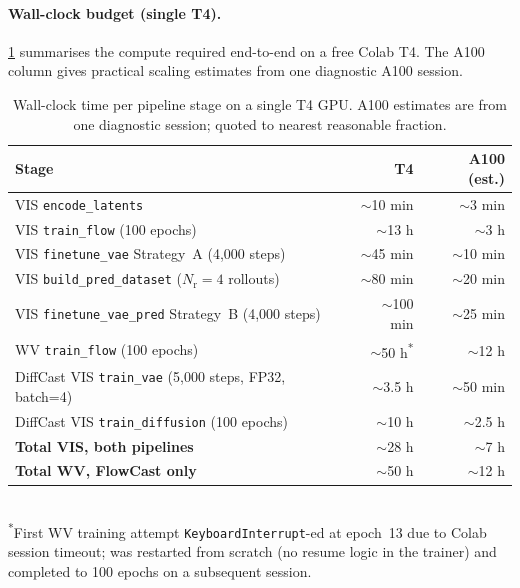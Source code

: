 \documentclass[11pt,a4paper]{article}
\begin{document}
\paragraph{Wall-clock budget (single T4).} \cref{tab:walltime} summarises
the compute required end-to-end on a free Colab T4. The A100 column gives
practical scaling estimates from one diagnostic A100 session.

\begin{table}[h]
\centering\small
\caption{Wall-clock time per pipeline stage on a single T4 GPU. A100
estimates are from one diagnostic session; quoted to nearest reasonable
fraction.}
\label{tab:walltime}
\begin{tabular}{lrr}
\toprule
Stage                                              & T4         & A100 (est.) \\
\midrule
VIS \texttt{encode\_latents}                       & $\sim$10 min   & $\sim$3 min  \\
VIS \texttt{train\_flow} (100 epochs)              & $\sim$13 h     & $\sim$3 h    \\
VIS \texttt{finetune\_vae} Strategy~A (4{,}000 steps) & $\sim$45 min  & $\sim$10 min \\
VIS \texttt{build\_pred\_dataset} ($N_\text{r}=4$ rollouts) & $\sim$80 min & $\sim$20 min \\
VIS \texttt{finetune\_vae\_pred} Strategy~B (4{,}000 steps) & $\sim$100 min & $\sim$25 min \\
WV \texttt{train\_flow} (100 epochs)               & $\sim$50 h\textsuperscript{*} & $\sim$12 h \\
DiffCast VIS \texttt{train\_vae} (5{,}000 steps, FP32, batch=4) & $\sim$3.5 h & $\sim$50 min \\
DiffCast VIS \texttt{train\_diffusion} (100 epochs) & $\sim$10 h    & $\sim$2.5 h  \\
\midrule
\textbf{Total VIS, both pipelines}                 & $\sim$28 h     & $\sim$7 h    \\
\textbf{Total WV, FlowCast only}                   & $\sim$50 h     & $\sim$12 h   \\
\bottomrule
\end{tabular}
\\[0.3em]
\footnotesize\textsuperscript{*}First WV training attempt
\texttt{KeyboardInterrupt}-ed at epoch~13 due to Colab session timeout; was
restarted from scratch (no resume logic in the trainer) and completed
to 100 epochs on a subsequent session.
\end{table}
\end{document}
